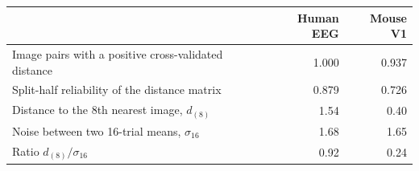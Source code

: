 \begin{tabular}{lrr}
\toprule
 & Human EEG & Mouse V1 \\
\midrule
Image pairs with a positive cross-validated distance & 1.000 & 0.937 \\
Split-half reliability of the distance matrix & 0.879 & 0.726 \\
Distance to the 8th nearest image, $d_{(8)}$ & 1.54 & 0.40 \\
Noise between two 16-trial means, $\sigma_{16}$ & 1.68 & 1.65 \\
Ratio $d_{(8)}/\sigma_{16}$ & 0.92 & 0.24 \\
\bottomrule
\end{tabular}
